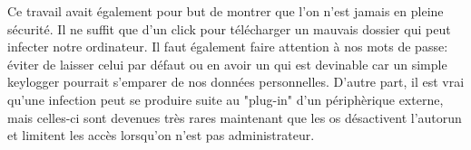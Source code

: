 Ce travail avait également pour but de montrer que l'on n'est jamais en pleine sécurité. Il ne suffit que d'un click pour télécharger un mauvais dossier qui peut infecter notre ordinateur. Il faut également faire attention à nos mots de passe: éviter de laisser celui par défaut ou en avoir un qui est devinable car un simple keylogger pourrait s'emparer de nos données personnelles. D'autre part, il est vrai qu'une infection peut se produire suite au "plug-in" d'un périphèrique externe, mais celles-ci sont devenues très rares maintenant que les os désactivent l'autorun et limitent les accès lorsqu'on n'est pas administrateur. 